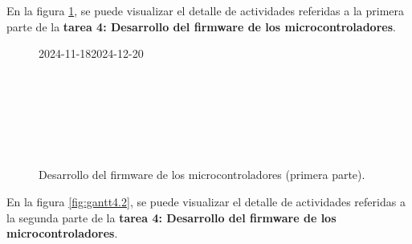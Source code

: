 En la figura \ref{fig:gantt4.1}, se puede visualizar el detalle de actividades
referidas a la primera parte de la \textbf{tarea 4: Desarrollo del firmware de
	los microcontroladores}.

\begin{figure}[H]
	\begin{ganttchart}[
			time slot unit=day,
			time slot format=isodate,
			x unit=0.33cm, %
			y unit title=0.7cm, %
			y unit chart=0.7cm, %
			milestone/.append style={xscale=4},
			vgrid,
			hgrid,
		]{2024-11-18}{2024-12-20}
		 \\
		 \\
		 \\
		 \\
		 \\
		 \\
		 \\
	\end{ganttchart}
	\caption{Desarrollo del firmware de los microcontroladores (primera parte).}
	\label{fig:gantt4.1}
\end{figure}

En la figura \ref{fig:gantt4.2}, se puede visualizar el detalle de actividades
referidas a la segunda parte de la \textbf{tarea 4: Desarrollo del firmware de
	los microcontroladores}.

